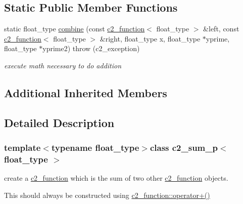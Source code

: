 \subsection*{Static Public Member Functions}
\begin{DoxyCompactItemize}
\item 
\hypertarget{classc2__sum__p_a887d3abd4f31de3119a5c97e5558ef24}{static float\-\_\-type \hyperlink{classc2__sum__p_a887d3abd4f31de3119a5c97e5558ef24}{combine} (const \hyperlink{classc2__function}{c2\-\_\-function}$<$ float\-\_\-type $>$ \&left, const \hyperlink{classc2__function}{c2\-\_\-function}$<$ float\-\_\-type $>$ \&right, float\-\_\-type x, float\-\_\-type $\ast$yprime, float\-\_\-type $\ast$yprime2)  throw (c2\-\_\-exception)}\label{classc2__sum__p_a887d3abd4f31de3119a5c97e5558ef24}

\begin{DoxyCompactList}\small\item\em execute math necessary to do addition \end{DoxyCompactList}\end{DoxyCompactItemize}
\subsection*{Additional Inherited Members}


\subsection{Detailed Description}
\subsubsection*{template$<$typename float\-\_\-type$>$class c2\-\_\-sum\-\_\-p$<$ float\-\_\-type $>$}

create a \hyperlink{classc2__function}{c2\-\_\-function} which is the sum of two other \hyperlink{classc2__function}{c2\-\_\-function} objects.

This should always be constructed using \hyperlink{classc2__function_a268b206b47c55e635e5f0a9e0f3e8ded}{c2\-\_\-function\-::operator+()} 


